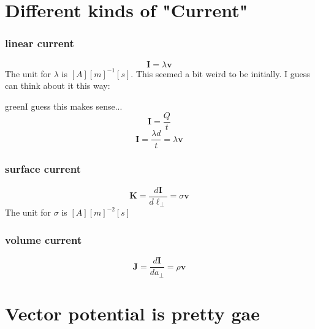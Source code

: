 \documentclass[12pt,a4paper]{extreport}
\numberwithin{equation}{chapter}
\begin{document}
    \section{Different kinds of "Current"}
    \subsubsection{linear current}
    \begin{equation}
        \mathbf{I}=\lambda \mathbf{v}
    \end{equation}
    The unit for $\lambda$ is $[A][m]^{-1}[s]$.
    This seemed a bit weird to be initially. I guess can think about it this way:
    \begin{mybox}{green}{I guess this makes sense...}
        \begin{equation}
            \mathbf{I}=\frac{Q}{t}
        \end{equation}
        \begin{equation}
            \mathbf{I}=\frac{\lambda d}{t}=\lambda \mathbf{v}
        \end{equation}
    \end{mybox}
    \subsubsection{surface current}
    \begin{equation}
        \mathbf{K}=\frac{d\mathbf{I}}{d\ell_\perp}=\sigma \mathbf{v}
    \end{equation}
    The unit for $\sigma$ is $[A][m]^{-2}[s]$
    \subsubsection{volume current}
    \begin{equation}
        \mathbf{J}=\frac{d\mathbf{I}}{da_\perp}=\rho \mathbf{v}
    \end{equation}
    \section{Vector potential is pretty gae}
    
\end{document}
